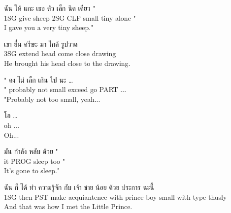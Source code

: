 \documentclass{book}
\begin{document}
	\begin{exe}
		\ex 
		\gll ฉัน ให้ แกะ เธอ ตัว เล็ก นิด เดียว "\\
		\textsc{1SG} give sheep \textsc{2SG} \textsc{CLF} small tiny alone "\\
		I gave you a very tiny sheep."
	\end{exe}

	\begin{exe}
		\ex 
		\gll เขา ยื่น ศรีษะ มา ใกล้ รูปวาด\\
		\textsc{3SG} extend head come close drawing\\
		He brought his head close to the drawing.
	\end{exe}

	\begin{exe}
		\ex 
		\gll " คง ไม่ เล็ก เกิน ไป นะ …\\
		" probably not small exceed go \textsc{PART} ...\\
		"Probably not too small, yeah...
	\end{exe}

	\begin{exe}
		\ex 
		\gll โอ …\\
		oh ...\\
		Oh...
	\end{exe}

	\begin{exe}
		\ex 
		\gll มัน กำลัง หลับ ด้วย "\\
		it \textsc{PROG} sleep too "\\
		It's gone to sleep."
	\end{exe}

	\begin{exe}
		\ex 
		\gll ฉัน ก็ ได้ ทำ ความรู้จัก กับ เจ้า ชาย น้อย ด้วย ประการ ฉะนี้\\
		\textsc{1SG} then \textsc{PST} make acquiantence with prince boy small with type thusly\\
		And that was how I met the Little Prince.
	\end{exe}
\end{document}
